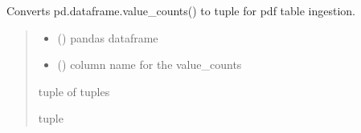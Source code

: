 \documentclass[letterpaper,10pt,english]{sphinxmanual}
\begin{document}
\begin{fulllineitems}
\label{\detokenize{auxilary_functions:auxilary_functions.pd_to_tuple}}
\pysigstartsignatures
{}
\pysigstopsignatures
\sphinxAtStartPar
Converts pd.dataframe.value\_counts() to tuple for pdf table ingestion.
\begin{quote}\begin{description}
\begin{itemize}
\item {} 
\sphinxAtStartPar
{} () \textendash{} pandas dataframe

\item {} 
\sphinxAtStartPar
{} () \textendash{} column name for the value\_counts

\end{itemize}

\sphinxAtStartPar
tuple of tuples

\sphinxAtStartPar
tuple

\end{description}\end{quote}

\end{fulllineitems}

\end{document}
